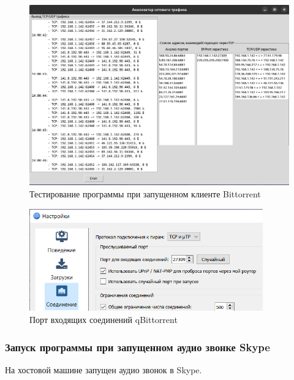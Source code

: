 \documentclass[bachelor, och, coursework]{SCWorks}
\begin{document}
\begin{figure}[H]
    \centering
    \includegraphics[width=0.999\textwidth]{test3.png}
    \caption{Тестирование программы при запущенном клиенте Bittorrent}
    \label{test3}
\end{figure}

\begin{figure}[H]
    \centering
    \includegraphics[width=0.899\textwidth]{btport.png}
    \caption{Порт входящих соединений qBittorrent}
    \label{btport}
\end{figure}

\newpage
\subsubsection{Запуск программы при запущенном аудио звонке Skype}
На хостовой машине запущен аудио звонок в Skype.
\end{document}
